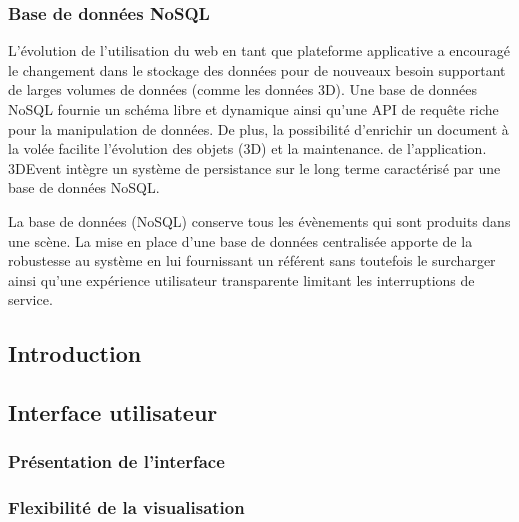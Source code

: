 \subsubsection{Base de données NoSQL}\label{p:nosql} L'évolution de 
l'utilisation du web en tant que plateforme applicative a encouragé le changement 
dans le stockage des données pour de nouveaux besoin supportant de larges 
volumes de données (comme les données 3D). Une base de données \gls{NoSQL} 
fournie un schéma libre et dynamique ainsi qu'une API de requête riche pour la 
manipulation de données. De plus, la possibilité d'enrichir un document à la volée 
facilite l'évolution des objets (3D) et la maintenance. de l'application.
3DEvent intègre un système de persistance sur le long terme caractérisé par une 
base de données \gls{NoSQL}.

La base de données (\gls{NoSQL}) conserve tous les évènements qui 
sont produits dans une scène. 
La mise en place d'une base de données centralisée apporte de la robustesse au 
système en lui fournissant un référent sans toutefois le surcharger ainsi qu'une 
expérience utilisateur transparente limitant les interruptions de service.

\subsection{Introduction}
\subsection{Interface utilisateur}
\subsubsection{Présentation de l'interface}
\subsubsection{Flexibilité de la visualisation}
